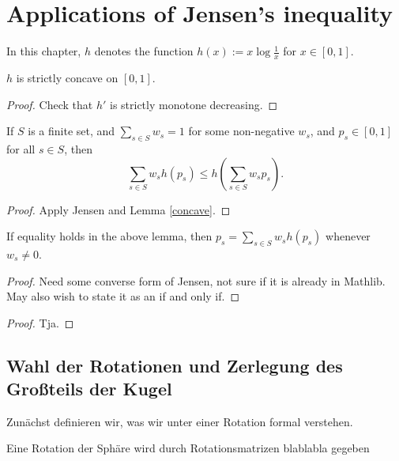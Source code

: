 \chapter{Applications of Jensen's inequality}

In this chapter, $h$ denotes the function $h(x) := x \log \frac{1}{x}$ for $x \in [0,1]$.

\begin{lemma}[Concavity]\label{concave}
  \leanok
  $h$ is strictly concave on $[0,1]$.
\end{lemma}

\begin{proof} \leanok Check that $h'$ is strictly monotone decreasing.
\end{proof}

\begin{lemma}[Jensen]\label{jensen}
   \leanok
  If $S$ is a finite set, and $\sum_{s \in S} w_s = 1$ for some non-negative $w_s$, and $p_s \in [0,1]$ for all $s \in S$, then
  $$ \sum_{s \in S} w_s h(p_s) \leq h(\sum_{s \in S} w_s p_s).$$
\end{lemma}

\begin{proof} \leanok Apply Jensen and Lemma \ref{concave}.
\end{proof}

\begin{lemma}\label{converse-jensen}
  \leanok
If equality holds in the above lemma, then $p_s = \sum_{s \in S} w_s h(p_s)$ whenever $w_s \neq 0$.
\end{lemma}

\begin{proof} \leanok Need some converse form of Jensen, not sure if it is already in Mathlib.  May also wish to state it as an if and only if.
\end{proof}

\begin{lemma}[moin]\label{unnoetig}
\end{lemma}
\begin{proof}
Tja.
\end{proof}
\section{Wahl der Rotationen und Zerlegung des Großteils der Kugel}
Zunächst definieren wir, was wir unter einer Rotation formal verstehen.
\begin{definition}[Rotationsmatrix]\label{def:rot}
Eine Rotation der Sphäre wird durch Rotationsmatrizen blablabla gegeben
\end{definition}


